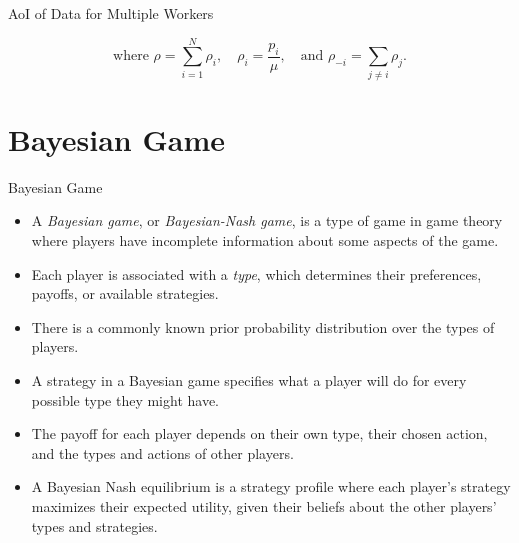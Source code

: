 \documentclass[aspectratio=169,xcolor=dvipsnames]{beamer}
\begin{document}
\begin{frame}[fragile]{AoI of Data for Multiple Workers}

        \vspace{-0.5cm}
       \[
        \text{where } \rho = \sum_{i=1}^N \rho_i, \quad \rho_i = \frac{p_i}{\mu}, \quad \text{and } \rho_{-i} = \sum_{j \neq i} \rho_j.
        \]
 
\end{frame}

\section{Bayesian Game}

\begin{frame}[fragile]{Bayesian Game}
    \footnotesize %
    \begin{itemize}[<+-| alert@+>]
        \setlength{\itemsep}{1em} %
        \item A \textit{Bayesian game}, or \textit{Bayesian-Nash game}, is a type of game in game theory where players have incomplete information about some aspects of the game.\\
        \item Each player is associated with a \textit{type}, which determines their preferences, payoffs, or available strategies.\\
        \item There is a commonly known prior probability distribution over the types of players.\\
        \item A strategy in a Bayesian game specifies what a player will do for every possible type they might have.\\
        \item The payoff for each player depends on their own type, their chosen action, and the types and actions of other players.\\
        \item A Bayesian Nash equilibrium is a strategy profile where each player's strategy maximizes their expected utility, given their beliefs about the other players' types and strategies.
    \end{itemize}
 
\end{frame}
\end{document}
